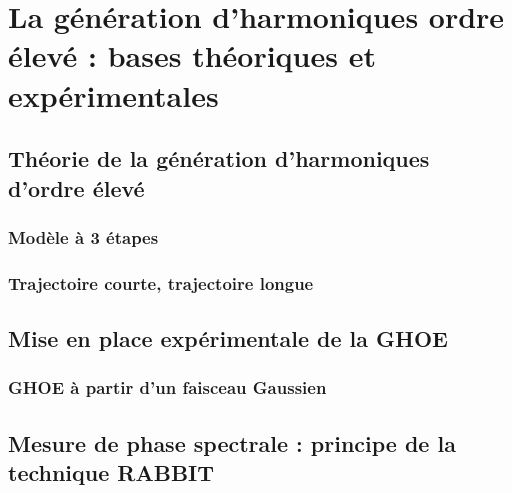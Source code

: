 \chapter{La génération d'harmoniques ordre élevé : bases théoriques et expérimentales}
\section{Théorie de la génération d'harmoniques d'ordre élevé}
\subsection{Modèle à 3 étapes}
\subsection{Trajectoire courte, trajectoire longue}
\label{sec:thTraj}
\section{Mise en place expérimentale de la GHOE}
\subsection{GHOE à partir d'un faisceau Gaussien}
\label{sec:expHHG}
\section{Mesure de phase spectrale : principe de la technique RABBIT}
\label{sec:thRABBIT}
